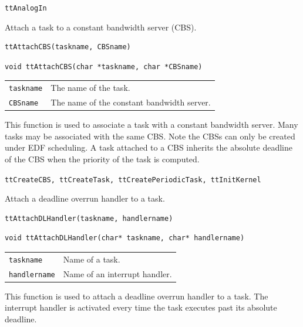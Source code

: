 \documentclass[final,twoside]{rapport}
\begin{document}
\seealso
{\tt ttAnalogIn}



\purpose
Attach a task to a constant bandwidth server (CBS). 

\Msyntax
\begin{verbatim}
ttAttachCBS(taskname, CBSname)
\end{verbatim}

\Csyntax
\begin{verbatim}
void ttAttachCBS(char *taskname, char *CBSname)
\end{verbatim}

\args
\begin{tabularx}{\hsize}{l>{\raggedright\arraybackslash}X}
  {\tt taskname} & The name of the task. \\
  {\tt CBSname} & The name of the constant bandwidth server.
\end{tabularx}

\descr This function is used to associate a task with a constant
bandwidth server. Many tasks may be associated with the same CBS. 
Note the CBSs can only be created under EDF scheduling. A task
attached to a CBS inherits the absolute deadline of the CBS when the
priority of the task is computed.

\seealso
{\tt ttCreateCBS, ttCreateTask, ttCreatePeriodicTask, ttInitKernel}



\purpose
Attach a deadline overrun handler to a task.

\Msyntax
\begin{verbatim}
ttAttachDLHandler(taskname, handlername)
\end{verbatim}

\Csyntax
\begin{verbatim}
void ttAttachDLHandler(char* taskname, char* handlername)
\end{verbatim}

\args
\begin{tabularx}{\hsize}{l>{\raggedright\arraybackslash}X}
  {\tt taskname} & Name of a task. \\
  {\tt handlername} & Name of an interrupt handler.
\end{tabularx}

\descr This function is used to attach a deadline overrun handler to a
task. The interrupt handler is activated every time the task executes
past its absolute deadline.
\end{document}
